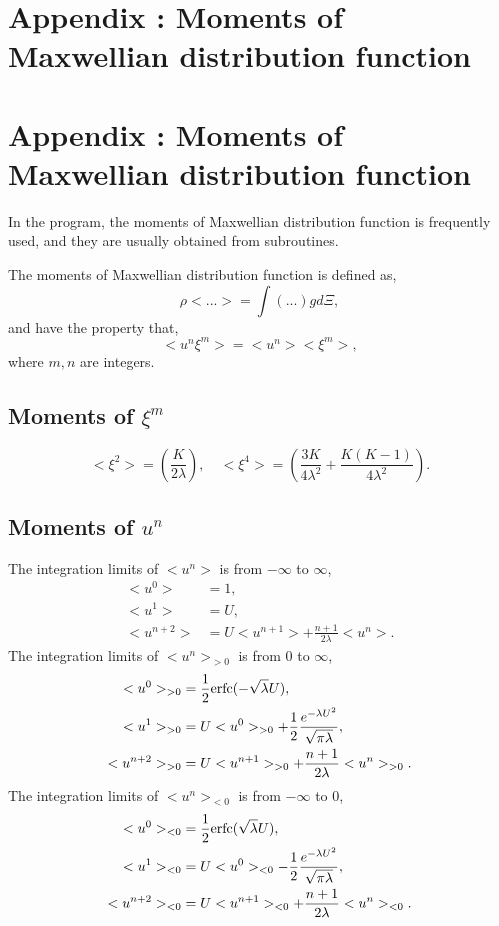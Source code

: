 \documentclass[a4paper]{book}
\makeatletter
\newcommand{\appxchapter}[2][\@empty]{
    \ifx\@empty#1
    \chapter{Appendix \Alph{chapter}: #2}
    \else
    \chapter[#1]{Appendix \Alph{chapter}: #2}
    \fi
}
\makeatother
\begin{document}
\begin{appendices}
    \setcounter{chapter}{1}

    \appxchapter{Moments of Maxwellian distribution function}
    \label{appendix:moments}
    In the program, the moments of Maxwellian distribution function is frequently used, and they are usually obtained from subroutines.

    The moments of Maxwellian distribution function is defined as,
    $$\rho<...>=\int(...)gd\Xi,$$
    and have the property that,
    $$<u^n \xi^m> = <u^n><\xi^m>,$$
    where $m,n$ are integers.

    \section*{Moments of $\xi^m$}
    $$<\xi^2>=\left(\frac{K}{2\lambda}\right),\quad <\xi^4>=\left(\frac{3K}{4\lambda^2}+\frac{K(K-1)}{4\lambda^2}\right).$$

    \section*{Moments of $u^n$}
    The integration limits of $<u^n>$ is from $-\infty$ to $\infty$,
    $$
    \begin{aligned}
        <u^0> &= 1,\\
        <u^1> &= U,\\
        <u^{n+2}> &= U<u^{n+1}>+\frac{n+1}{2\lambda}<u^n>.
    \end{aligned} 
    $$
    The integration limits of $<u^n>_{>0}$ is from $0$ to $\infty$,
    $$
    \begin{aligned}
        <u^0>_{>0} &= \frac{1}{2}{\rm erfc}(-\sqrt{\lambda}U), \\
        <u^1>_{>0} &= U<u^0>_{>0}+\frac{1}{2}\frac{e^{-\lambda U^2}}{\sqrt{\pi\lambda}}, \\
        <u^{n+2}>_{>0} &= U<u^{n+1}>_{>0}+\frac{n+1}{2\lambda}<u^n>_{>0}.
    \end{aligned} 
    $$
    The integration limits of $<u^n>_{<0}$ is from $-\infty$ to $0$,
    $$
    \begin{aligned}
        <u^0>_{<0} &= \frac{1}{2}{\rm erfc}(\sqrt{\lambda}U), \\
        <u^1>_{<0} &= U<u^0>_{<0}-\frac{1}{2}\frac{e^{-\lambda U^2}}{\sqrt{\pi\lambda}}, \\
        <u^{n+2}>_{<0} &= U<u^{n+1}>_{<0}+\frac{n+1}{2\lambda}<u^n>_{<0}.
    \end{aligned} 
    $$


\end{appendices}
\end{document}

